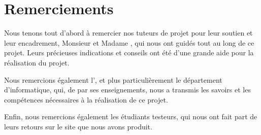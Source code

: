 \chapter*{Remerciements}

Nous tenons tout d'abord à remercier nos tuteurs de projet pour leur soutien et leur encadrement, Monsieur  et Madame , qui nous ont guidés tout au long de ce projet. 
Leurs précieuses indications et conseils ont été d'une grande aide pour la réalisation du projet.
\bigskip

Nous remercions également l'\univ, et plus particulièrement le département d'informatique, qui, de par ses enseignements, nous a transmis les savoirs et les compétences nécessaires à la réalisation de ce projet.
\bigskip


Enfin, nous remercions également les étudiants testeurs, qui nous ont fait part de leurs retours sur le site que nous avons produit.
